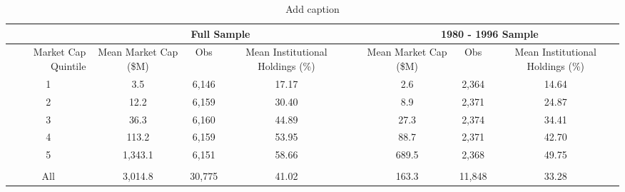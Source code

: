 \begin{table}[htbp]
  \centering
  \caption{Add caption}
    \begin{tabular}{rcccrccc}
    \toprule
          & \multicolumn{3}{c}{Full Sample} &       & \multicolumn{3}{c}{1980 - 1996 Sample} \\
    \midrule
    Market 
Cap 
Quintile & Mean
Market
Cap (\$M) & Obs   & Mean 
Institutional 
Holdings (\%) & \multicolumn{1}{c}{} & Mean 
Market 
Cap (\$M) & Obs   & Mean 
Institutional 
Holdings (\%) \\
    \multicolumn{1}{c}{1} & 3.5   & 6,146 & 17.17 & \multicolumn{1}{c}{} & 2.6   & 2,364 & 14.64 \\
    \multicolumn{1}{c}{2} & 12.2  & 6,159 & 30.40 & \multicolumn{1}{c}{} & 8.9   & 2,371 & 24.87 \\
    \multicolumn{1}{c}{3} & 36.3  & 6,160 & 44.89 & \multicolumn{1}{c}{} & 27.3  & 2,374 & 34.41 \\
    \multicolumn{1}{c}{4} & 113.2 & 6,159 & 53.95 & \multicolumn{1}{c}{} & 88.7  & 2,371 & 42.70 \\
    \multicolumn{1}{c}{5} & 1,343.1 & 6,151 & 58.66 & \multicolumn{1}{c}{} & 689.5 & 2,368 & 49.75 \\
    \multicolumn{1}{c}{} &       &       &       & \multicolumn{1}{c}{} &       &       &  \\
    \multicolumn{1}{c}{All} & 3,014.8 & 30,775 & 41.02 & \multicolumn{1}{c}{} & 163.3 & 11,848 & 33.28 \\
    \bottomrule
    \end{tabular}%
  \label{tab:addlabel}%
\end{table}%
